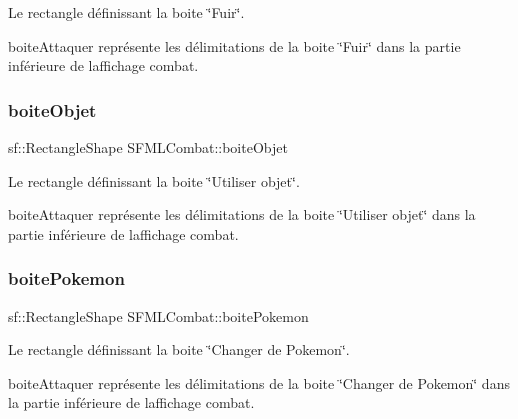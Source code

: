 Le rectangle définissant la boite \char`\"{}\+Fuir\char`\"{}. 

boite\+Attaquer représente les délimitations de la boite \char`\"{}\+Fuir\char`\"{} dans la partie inférieure de l\textquotesingle{}affichage combat. \mbox{\label{class_s_f_m_l_combat_a7a7d3634ff67cf57c61d343e07800586}} 
\subsubsection{\texorpdfstring{boite\+Objet}{boiteObjet}}
{\footnotesize\ttfamily sf\+::\+Rectangle\+Shape S\+F\+M\+L\+Combat\+::boite\+Objet\hspace{0.3cm}{\ttfamily [private]}}



Le rectangle définissant la boite \char`\"{}\+Utiliser objet\char`\"{}. 

boite\+Attaquer représente les délimitations de la boite \char`\"{}\+Utiliser objet\char`\"{} dans la partie inférieure de l\textquotesingle{}affichage combat. \mbox{\label{class_s_f_m_l_combat_a752cb4de138e2aa37f12c237efea253e}} 
\subsubsection{\texorpdfstring{boite\+Pokemon}{boitePokemon}}
{\footnotesize\ttfamily sf\+::\+Rectangle\+Shape S\+F\+M\+L\+Combat\+::boite\+Pokemon\hspace{0.3cm}{\ttfamily [private]}}



Le rectangle définissant la boite \char`\"{}\+Changer de Pokemon\char`\"{}. 

boite\+Attaquer représente les délimitations de la boite \char`\"{}\+Changer de Pokemon\char`\"{} dans la partie inférieure de l\textquotesingle{}affichage combat. \mbox{\label{class_s_f_m_l_combat_ad76ea7634796fda2075edda681735375}} 
